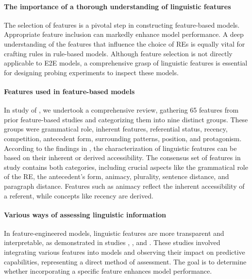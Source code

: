 \paragraph*{The importance of a thorough understanding of linguistic features}
The selection of features is a pivotal step in constructing feature-based \context models. Appropriate feature inclusion can markedly enhance model performance. A deep understanding of the features that influence the choice of REs is equally vital for crafting rules in rule-based models. Although feature selection is not directly applicable to E2E models, a comprehensive grasp of linguistic features is essential for designing probing experiments to inspect these models.

\paragraph*{Features used in feature-based \context models}
In study \studB of , we undertook a comprehensive review, gathering 65 features from prior feature-based \context studies and categorizing them into nine distinct groups. These groups were grammatical role, inherent features, referential status, recency, competition, antecedent form, surrounding patterns, position, and protagonism. According to the findings in , the characterization of linguistic features can be based on their inherent or derived accessibility. The consensus set of features in study \studB contains both categories, including crucial aspects like the grammatical role of the RE, the antecedent's form, animacy, plurality, sentence distance, and paragraph distance. Features such as animacy reflect the inherent accessibility of a referent, while concepts like recency are derived.

\paragraph*{Various ways of assessing linguistic information}
In feature-engineered models, linguistic features are more transparent and interpretable, as demonstrated in studies \studB, \studC, and \studE. These studies involved integrating various features into models and observing their impact on predictive capabilities, representing a direct method of assessment. The goal is to determine whether incorporating a specific feature enhances model performance.

